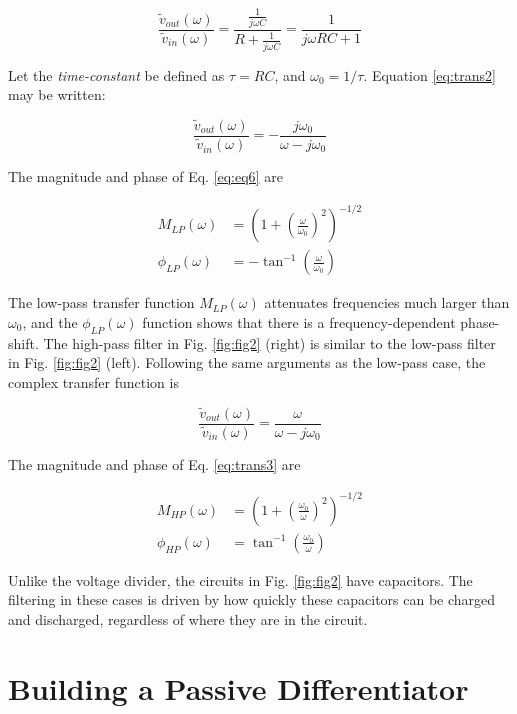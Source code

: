 \documentclass[12pt]{article}
\begin{document}
\begin{equation}
\frac{\tilde{v}_{out}(\omega)}{\tilde{v}_{in}(\omega)} = \frac{\frac{1}{j\omega C}}{R+\frac{1}{j\omega C}} = \frac{1}{j\omega R C + 1}
\label{eq:trans2}
\end{equation}

Let the \textit{time-constant} be defined as $\tau = RC$, and $\omega_0 = 1/\tau$.  Equation \ref{eq:trans2} may be written:

\begin{equation}
\frac{\tilde{v}_{out}(\omega)}{\tilde{v}_{in}(\omega)} = -\frac{j\omega_0}{\omega - j\omega_0}
\label{eq:eq6}
\end{equation}

The magnitude and phase of Eq. \ref{eq:eq6} are

\begin{align}
M_{LP}(\omega) &= \left( 1 + \left( \frac{\omega}{\omega_0}\right)^2 \right)^{-1/2} \\
\phi_{LP}(\omega) &= -\tan^{-1}\left(\frac{\omega}{\omega_0}\right)
\label{eq:eq7}
\end{align}

The low-pass transfer function $M_{LP}(\omega)$ attenuates frequencies much larger than $\omega_0$, and the $\phi_{LP}(\omega)$ function shows that there is a frequency-dependent phase-shift.  The high-pass filter in Fig. \ref{fig:fig2} (right) is similar to the low-pass filter in Fig. \ref{fig:fig2} (left).  Following the same arguments as the low-pass case, the complex transfer function is

\begin{equation}
\frac{\tilde{v}_{out}(\omega)}{\tilde{v}_{in}(\omega)} = \frac{\omega}{\omega - j\omega_0}
\label{eq:trans3}
\end{equation}

The magnitude and phase of Eq. \ref{eq:trans3} are

\begin{align}
M_{HP}(\omega) &= \left( 1 + \left( \frac{\omega_0}{\omega}\right)^2 \right)^{-1/2} \\
\phi_{HP}(\omega) &= \tan^{-1}\left(\frac{\omega_0}{\omega}\right)
\end{align}

Unlike the voltage divider, the circuits in Fig. \ref{fig:fig2} have capacitors.  The filtering in these cases is driven by how quickly these capacitors can be charged and discharged, regardless of where they are in the circuit.

\section{Building a Passive Differentiator}
\end{document}
